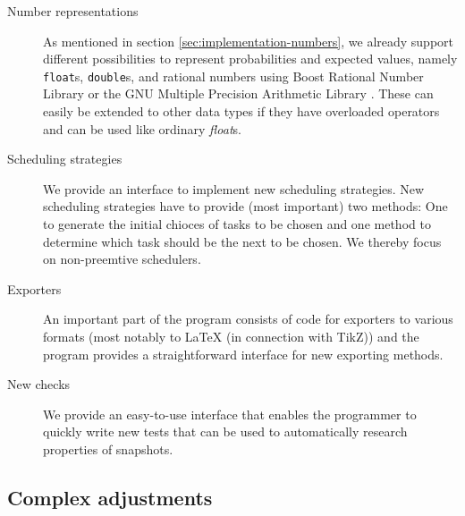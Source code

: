 \begin{description}
\item[Number representations] As mentioned in section \ref{sec:implementation-numbers}, we already support different possibilities to represent probabilities and expected values, namely \texttt{float}s, \texttt{double}s, and rational numbers using Boost Rational Number Library \cite{boostrational} or the GNU Multiple Precision Arithmetic Library \cite{gnumultiprecision}. These can easily be extended to other data types if they have overloaded operators and can be used like ordinary \emph{float}s.
\item[Scheduling strategies] We provide an interface to implement new scheduling strategies. New scheduling strategies have to provide (most important) two methods: One to generate the initial chioces of tasks to be chosen and one method to determine which task should be the next to be chosen. We thereby focus on non-preemtive schedulers.
\item[Exporters] An important part of the program consists of code for exporters to various formats (most notably to \LaTeX{} (in connection with TikZ)) and the program provides a straightforward interface for new exporting methods.
\item[New checks] We provide an easy-to-use interface that enables the programmer to quickly write new tests that can be used to automatically research properties of snapshots.
\end{description}

\subsection{Complex adjustments}
\label{sec:implementations-extensions-moderate}


